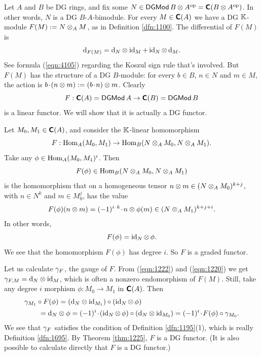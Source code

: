 \begin{exa} \label{exa:1118}
Let $A$ and $B$  be DG rings, and fix some 
$N \in \operatorname{\mathsf{DGMod}} B \otimes A^{\mathrm{op}} = \boldsymbol{\mathsf{C}}(B \otimes A^{\mathrm{op}})$.
In other words, $N$ is a DG $B$-$A$-bimodule. 
For every $M \in \boldsymbol{\mathsf{C}}(A)$ we have a DG $\mathbb{K}$-module
$F(M) := N \otimes_{A} M$,
as in Definition \ref{dfn:1100}. 
The differential of $F(M)$ is
\begin{equation} \label{eqn:1220}
\mathrm{d}_{F(M)} = \mathrm{d}_N \otimes \operatorname{id}_M + \operatorname{id}_N \otimes \, \mathrm{d}_M . 
\end{equation}
See formula (\ref{eqn:4105}) 
regarding the Koszul sign rule that's involved.
But $F(M)$ has the structure of a DG $B$-module: for every $b \in B$, 
$n \in N$ and $m \in M$, the action is 
$b \mspace{1.5mu}{\cdot}\mspace{1.5mu} (n \otimes m) := (b \mspace{1.5mu}{\cdot}\mspace{1.5mu} n) \otimes m$.
Clearly 
\[ F : \boldsymbol{\mathsf{C}}(A) = \operatorname{\mathsf{DGMod}} A \to \boldsymbol{\mathsf{C}}(B) = \operatorname{\mathsf{DGMod}} B \]
is a linear functor. We will show that it is actually a DG functor. 

Let $M_0, M_1 \in \boldsymbol{\mathsf{C}}(A)$, and consider the $\mathbb{K}$-linear homomorphism 
\begin{equation} \label{eqn:1120}
F : \operatorname{Hom}_A(M_0, M_1) \to 
\operatorname{Hom}_B(N \otimes_{A} M_0, N \otimes_{A} M_1) .
\end{equation}
Take any $\phi \in \operatorname{Hom}_A(M_0, M_1)^i$. Then 
\[  F(\phi) \in \operatorname{Hom}_B(N \otimes_{A} M_0, N \otimes_{A} M_1) \]
is the homomorphism that on a homogeneous tensor 
$n \otimes m \in (N \otimes_{A} M_0)^{k + j}$, 
with  $n \in N^k$ and $m \in M_0^j$, has the value
\[ F(\phi) (n \otimes m) = (-1)^{i \mspace{1.5mu}{\cdot}\mspace{1.5mu} k} \mspace{1.5mu}{\cdot}\mspace{1.5mu} n \otimes \phi(m) \in 
(N \otimes_{A} M_1)^{k + j + i} .  \]
In other words, 
\begin{equation}  \label{eqn:1222}
F(\phi) = \operatorname{id}_N \otimes \, \phi . 
\end{equation}
We see that the homomorphism $F(\phi)$ has degree $i$. So
$F$ is a graded functor. 

Let us calculate $\gamma_F$, the gauge of $F$. 
From (\ref{eqn:1222}) and (\ref{eqn:1220}) we get 
$\gamma_{F, M} = \mathrm{d}_N \otimes \operatorname{id}_M$,
which is often a nonzero endomorphism of $F(M)$. Still, take any degree $i$ 
morphism $\phi : M_0 \to M_1$ 
in $\boldsymbol{\mathsf{C}}(A)$. Then 
\[ \begin{aligned}
& \gamma_{M_1} \circ F(\phi) = 
(\mathrm{d}_N \otimes \operatorname{id}_{M_1}) \circ (\operatorname{id}_N \otimes \, \phi)
\\ & \qquad
= \mathrm{d}_N \otimes \phi = 
(-1)^i \mspace{1.5mu}{\cdot}\mspace{1.5mu} (\operatorname{id}_N  \otimes \, \phi) \circ (\mathrm{d}_N \otimes \operatorname{id}_{M_0})  
= (-1)^i \mspace{1.5mu}{\cdot}\mspace{1.5mu} F(\phi) \circ \gamma_{M_0} . 
\end{aligned} \]
We see that $\gamma_F$ satisfies the condition of Definition \ref{dfn:1195}(1), 
which is really Definition \ref{dfn:1695}.
By Theorem \ref{thm:1225}, $F$ is a DG functor. (It is also possible to 
calculate directly that $F$ is a DG functor.) 


\end{exa}
